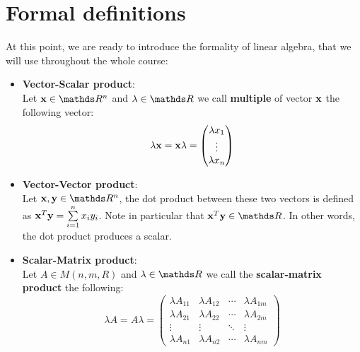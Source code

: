 \documentclass[computationalMathematics.tex]{subfiles}
\begin{document}
\section{Formal definitions}
At this point, we are ready to introduce the formality of linear algebra, that we will use throughout the whole course:
\begin{itemize}
    \item \textbf{Vector-Scalar product}:\\
      Let $\vect{x} \in \R^n$ and $\lambda \in \R$ we call \textbf{multiple} of vector ${\bf x }$ the following vector:
      \[
        \lambda {\bf x } = {\bf x } \lambda =
        \begin{pmatrix}
        \lambda x_1\\
        \vdots\\
        \lambda x_n\\
      \end{pmatrix}
      \]
    
    \item \textbf{Vector-Vector product}:\\
      Let $\vect{x}, \vect{y} \in \R^n$, the dot product between these two vectors is defined as ${{\bf x }}^{T} {\bf y } = \sum\limits_{i=1}^n x_i y_i$. Note in particular that $\tr{\vect{x}}\vect{y} \in \R$. In other words, the dot product produces a scalar.
     
     \item \textbf{Scalar-Matrix product}:\\
      Let $A \in M(n, m, R)$ and $\lambda \in \R$ we call the \textbf{scalar-matrix product} the following:
      \[
        \lambda A = A \lambda = 
        \begin{pmatrix}
        \lambda A_{11} & \lambda A_{12} & \cdots & \lambda A_{1m}\\
        \lambda A_{21} & \lambda A_{22} & \cdots & \lambda A_{2m}\\
        \vdots  & \vdots & \ddots & \vdots\\
        \lambda A_{n1} & \lambda A_{n2} & \cdots & \lambda A_{nm}
        \end{pmatrix}
      \]
     

\end{itemize}
\end{document}
